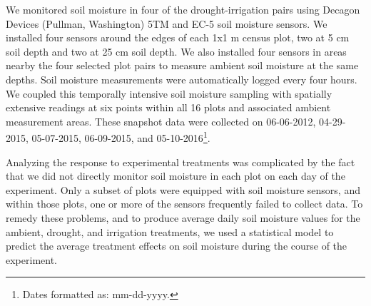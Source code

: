 \documentclass[fleqn,10pt,lineno]{wlpeerj} %
\begin{document}
We monitored soil moisture in four of the drought-irrigation pairs using
Decagon Devices (Pullman, Washington) 5TM and EC-5 soil moisture
sensors. We installed four sensors around the edges of each 1x1 m census
plot, two at 5 cm soil depth and two at 25 cm soil depth. We also
installed four sensors in areas nearby the four selected plot pairs to
measure ambient soil moisture at the same depths. Soil moisture
measurements were automatically logged every four hours. We coupled this
temporally intensive soil moisture sampling with spatially extensive
readings  at six points within
all 16 plots and associated ambient measurement areas. These snapshot
data were collected on 06-06-2012, 04-29-2015, 05-07-2015, 06-09-2015,
and 05-10-2016\footnote{Dates formatted as: mm-dd-yyyy.}.

Analyzing the response to experimental treatments was complicated by the
fact that we did not directly monitor soil moisture in each plot on each
day of the experiment. Only a subset of plots were equipped with soil
moisture sensors, and within those plots, one or more of the sensors
frequently failed to collect data. To remedy these problems, and to
produce average daily soil moisture values for the ambient, drought, and
irrigation treatments, we used a statistical model to predict the
average treatment effects on soil moisture during the course of the
experiment.

\end{document}
